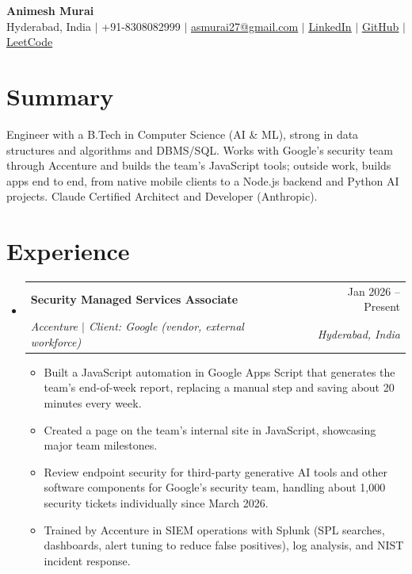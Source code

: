 \documentclass[a4paper,11pt]{article}
\makeatletter
\newcommand{\resumeItem}[1]{\item\small{#1\vspace{-1pt}}}
\newcommand{\resumeSubheading}[4]{
  \vspace{-1pt}\item
    \begin{tabularx}{0.97\textwidth}[t]{@{}>{\raggedright\arraybackslash}X@{\hspace{0.75em}}r@{}}
      \textbf{#1} & #2 \\
      \textit{\small#3} & \textit{\small #4} \\
    \end{tabularx}\vspace{-3pt}
}
\newcommand{\resumeSubItemListStart}{\begin{itemize}[leftmargin=0.15in, label={}]}
\newcommand{\resumeSubItemListEnd}{\end{itemize}}
\newcommand{\resumeItemListStart}{\begin{itemize}[itemsep=2pt]}
\newcommand{\resumeItemListEnd}{\end{itemize}\vspace{-2pt}}
\makeatother
\begin{document}
\begin{center}
    {\Huge\bfseries Animesh Murai} \\ \vspace{4pt}
    \small Hyderabad, India $|$ +91-8308082999 $|$
    \href{mailto:asmurai27@gmail.com}{\underline{asmurai27@gmail.com}} $|$
    \href{https://www.linkedin.com/in/animesh-murai-538384253/}{\underline{LinkedIn}} $|$
    \href{https://github.com/muraias7781}{\underline{GitHub}} $|$
    \href{https://leetcode.com/u/sAMurai7781/}{\underline{LeetCode}}
\end{center}

\section{Summary}
  \small{Engineer with a B.Tech in Computer Science (AI \& ML), strong in data structures and algorithms and DBMS/SQL. Works with Google's security team through Accenture and builds the team's JavaScript tools; outside work, builds apps end to end, from native mobile clients to a Node.js backend and Python AI projects. Claude Certified Architect and Developer (Anthropic).}

\section{Experience}
  \resumeSubItemListStart

    \resumeSubheading
      {Security Managed Services Associate}{Jan 2026 -- Present}
      {Accenture $|$ Client: Google (vendor, external workforce)}{Hyderabad, India}
      \resumeItemListStart
        \resumeItem{Built a JavaScript automation in Google Apps Script that generates the team's end-of-week report, replacing a manual step and saving about 20 minutes every week.}
        \resumeItem{Created a page on the team's internal site in JavaScript, showcasing major team milestones.}
        \resumeItem{Review endpoint security for third-party generative AI tools and other software components for Google's security team, handling about 1,000 security tickets individually since March 2026.}
        \resumeItem{Trained by Accenture in SIEM operations with Splunk (SPL searches, dashboards, alert tuning to reduce false positives), log analysis, and NIST incident response.}
      \resumeItemListEnd

  \resumeSubItemListEnd

\end{document}
